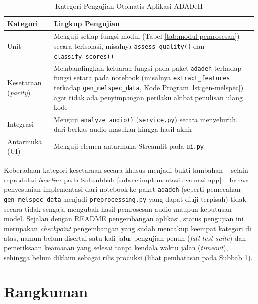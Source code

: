 \begin{table}[htbp]
  \centering
  \caption{Kategori Pengujian Otomatis Aplikasi ADADeH}
  \label{tab:kategori-pengujian}
  \begin{tabular}{@{}lp{8.8cm}@{}}
    \toprule
    \textbf{Kategori} & \textbf{Lingkup Pengujian} \\
    \midrule
    Unit & Menguji setiap fungsi modul (Tabel \ref{tab:modul-pemrosesan}) secara
    terisolasi, misalnya \texttt{assess\_quality()} dan \texttt{classify\_scores()} \\
    Kesetaraan (\textit{parity}) & Membandingkan keluaran fungsi pada paket
    \texttt{adadeh} terhadap fungsi setara pada notebook (misalnya
    \texttt{extract\_features} terhadap \texttt{gen\_melspec\_data}, Kode Program
    \ref{lst:gen-melspec}) agar tidak ada penyimpangan perilaku akibat penulisan
    ulang kode \\
    Integrasi & Menguji \texttt{analyze\_audio()} (\texttt{service.py}) secara
    menyeluruh, dari berkas audio masukan hingga hasil akhir \\
    Antarmuka (UI) & Menguji elemen antarmuka Streamlit pada \texttt{ui.py} \\
    \bottomrule
  \end{tabular}
\end{table}

Keberadaan kategori kesetaraan secara khusus menjadi bukti tambahan -- selain
reproduksi \textit{baseline} pada Subsubbab \ref{subsec:implementasi-evaluasi-app}
-- bahwa penyesuaian implementasi dari notebook ke paket \texttt{adadeh} (seperti
pemecahan \texttt{gen\_melspec\_data} menjadi \texttt{preprocessing.py} yang
dapat diuji terpisah) tidak secara tidak sengaja mengubah hasil pemrosesan audio
maupun keputusan model. Sejalan dengan README pengembangan aplikasi, status
pengujian ini merupakan \textit{checkpoint} pengembangan yang sudah mencakup
keempat kategori di atas, namun belum disertai satu kali jalur pengujian penuh
(\textit{full test suite}) dan pemeriksaan keamanan yang selesai tanpa kendala
waktu jalan (\textit{timeout}), sehingga belum diklaim sebagai rilis produksi
(lihat pembatasan pada Subbab \ref{sec:rangkuman-bab-iv}).

\section{Rangkuman}
\label{sec:rangkuman-bab-iv}

